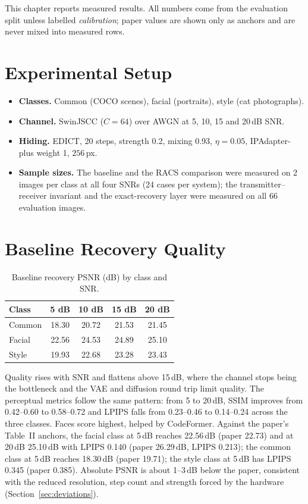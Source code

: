 This chapter reports measured results. All numbers come from the evaluation split unless
labelled \emph{calibration}; paper values are shown only as anchors and are never mixed into
measured rows.

\section{Experimental Setup}
\begin{itemize}
	\item \textbf{Classes.} Common (COCO scenes), facial (portraits), style (cat photographs).
	\item \textbf{Channel.} SwinJSCC ($C=64$) over AWGN at 5, 10, 15 and 20\,dB SNR.
	\item \textbf{Hiding.} EDICT, 20 steps, strength 0.2, mixing 0.93, $\eta = 0.05$, IPAdapter-plus
	weight 1, $256$\,px.
	\item \textbf{Sample sizes.} The baseline and the RACS comparison were measured on 2 images per
	class at all four SNRs (24 cases per system); the transmitter--receiver invariant and the
	exact-recovery layer were measured on all 66 evaluation images.
\end{itemize}

\section{Baseline Recovery Quality}
\begin{table}[H]
	\centering
	\caption{Baseline recovery PSNR (dB) by class and SNR.}
	\label{tab:basepsnr}
	\begin{tabular}{|l|c|c|c|c|}
		\hline
		\textbf{Class} & \textbf{5 dB} & \textbf{10 dB} & \textbf{15 dB} & \textbf{20 dB} \\ \hline
		Common & 18.30 & 20.72 & 21.53 & 21.45 \\ \hline
		Facial & 22.56 & 24.53 & 24.89 & 25.10 \\ \hline
		Style & 19.93 & 22.68 & 23.28 & 23.43 \\ \hline
	\end{tabular}
\end{table}

Quality rises with SNR and flattens above 15\,dB, where the channel stops being the bottleneck and
the VAE and diffusion round trip limit quality. The perceptual metrics follow the same pattern:
from 5 to 20\,dB, SSIM improves from 0.42--0.60 to 0.58--0.72 and LPIPS falls from 0.23--0.46 to
0.14--0.24 across the three classes. Faces score highest, helped by CodeFormer.
Against the paper's Table~II anchors, the facial class at 5\,dB reaches 22.56\,dB (paper 22.73)
and at 20\,dB 25.10\,dB with LPIPS 0.140 (paper 26.29\,dB, LPIPS 0.213); the common class at
5\,dB reaches 18.30\,dB (paper 19.71); the style class at 5\,dB has LPIPS 0.345 (paper 0.385).
Absolute PSNR is about 1--3\,dB below the paper, consistent with the reduced resolution, step
count and strength forced by the hardware (Section~\ref{sec:deviations}).

